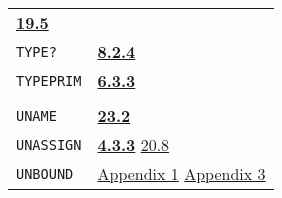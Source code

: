 \documentclass[a4paper,]{article}
\begin{document}
\begin{longtable}[]{@{}ll@{}}
\begin{minipage}[t]{0.70\columnwidth}
\textbf{\href{19-compiled-programs.md\#195-type-c-and-type-w}{19.5}}\strut
\end{minipage}\tabularnewline
\begin{minipage}[t]{0.24\columnwidth}\raggedright\strut
\texttt{TYPE?}\strut
\end{minipage} & \begin{minipage}[t]{0.70\columnwidth}\raggedright\strut
\textbf{\href{08-truth.md\#824-object-properties-1}{8.2.4}}\strut
\end{minipage}\tabularnewline
\begin{minipage}[t]{0.24\columnwidth}\raggedright\strut
\texttt{TYPEPRIM}\strut
\end{minipage} & \begin{minipage}[t]{0.70\columnwidth}\raggedright\strut
\textbf{\href{06-data-types.md\#633-typeprim-1}{6.3.3}}\strut
\end{minipage}\tabularnewline
\begin{minipage}[t]{0.24\columnwidth}\raggedright\strut
\strut
\end{minipage} & \begin{minipage}[t]{0.70\columnwidth}\raggedright\strut
\strut
\end{minipage}\tabularnewline
\begin{minipage}[t]{0.24\columnwidth}\raggedright\strut
\texttt{UNAME}\strut
\end{minipage} & \begin{minipage}[t]{0.70\columnwidth}\raggedright\strut
\textbf{\href{23-mdl-as-a-system-process.md\#232-names}{23.2}}\strut
\end{minipage}\tabularnewline
\begin{minipage}[t]{0.24\columnwidth}\raggedright\strut
\texttt{UNASSIGN}\strut
\end{minipage} & \begin{minipage}[t]{0.70\columnwidth}\raggedright\strut
\textbf{\href{04-values-of-atoms.md\#433-unassign}{4.3.3}}
\href{20-coroutines.md\#208-sneakiness-with-processes}{20.8}\strut
\end{minipage}\tabularnewline
\begin{minipage}[t]{0.24\columnwidth}\raggedright\strut
\texttt{UNBOUND}\strut
\end{minipage} & \begin{minipage}[t]{0.70\columnwidth}\raggedright\strut
\href{appendix-1-a-look-inside.md\#basic-data-structures}{Appendix 1}
\href{appendix-3-predefined-types.md\#appendix-3-predefined-types}{Appendix 3}\strut
\end{minipage}\tabularnewline

\end{longtable}
\end{document}
